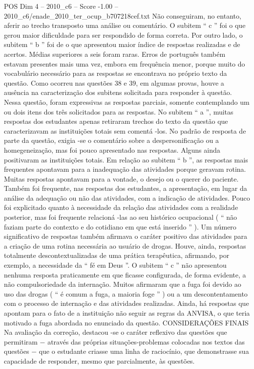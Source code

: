 \begin{textsample}{POS Dim 4 – 2010\_c6 – Score -1.00 – 2010\_c6/enade\_2010\_ter\_ocup\_b707218cef.txt}
Não conseguiram, no entanto, aferir ao trecho transposto uma análise ou comentário.
O subitem “ c ” foi o que gerou maior dificuldade para ser respondido de forma correta.
Por outro lado, o subitem “ b ” foi de o que apresentou maior índice de respostas realizadas e de acertos.
Médias superiores a seis foram raras.
Erros de português também estavam presentes mais uma vez, embora em frequência menor, porque muito do vocabulário necessário para as respostas se encontrava no próprio texto da questão.
Como ocorreu nas questões 38 e 39, em algumas provas, houve a ausência na caracterização dos subitens solicitada para responder à questão.
Nessa questão, foram expressivas as respostas parciais, somente contemplando um ou dois itens dos três solicitados para as respostas.
No subitem “ a ”, muitas respostas dos estudantes apenas retiraram trechos do texto da questão que caracterizavam as instituições totais sem comentá -los.
No padrão de resposta de parte da questão, exigia -se o comentário sobre a despersonificação ou a homegeneização, mas foi pouco apresentado nas respostas.
Alguns ainda positivaram as instituições totais.
Em relação ao subitem “ b ”, as respostas mais frequentes apontavam para a inadequação das atividades porque geravam rotina.
Muitas respostas apontavam para a vontade, o desejo ou o querer do paciente.
Também foi frequente, nas respostas dos estudantes, a apresentação, em lugar da análise da adequação ou não das atividades, com a indicação de atividades.
Pouco foi explicitado quanto à necessidade da relação das atividades com a realidade posterior, mas foi frequente relacioná -las ao seu histórico ocupacional ( “ não faziam parte do contexto e do cotidiano em que está inserido ” ).
Um número significativo de respostas também afirmava o caráter positivo das atividades para a criação de uma rotina necessária ao usuário de drogas.
Houve, ainda, respostas totalmente descontextualizadas de uma prática terapêutica, afirmando, por exemplo, a necessidade da “ fé em Deus ”.
O subitem “ c ” não apresentou nenhuma resposta praticamente em que ficasse configurada, de forma evidente, a não compulsoriedade da internação.
Muitos afirmaram que a fuga foi devido ao uso das drogas ( “ é comum a fuga, a maioria foge ” ) ou a um descontentamento com o processo de internação e das atividades realizadas.
Ainda, há respostas que apontam para o fato de a instituição não seguir as regras da ANVISA, o que teria motivado a fuga abordada no enunciado da questão.
CONSIDERAÇÕES FINAIS Na avaliação da correção, destacou -se o caráter reflexivo das questões que permitiram − através das próprias situações-problemas colocadas nos textos das questões − que o estudante criasse uma linha de raciocínio, que demonstrasse sua capacidade de responder, mesmo que parcialmente, às questões.

\end{textsample}
